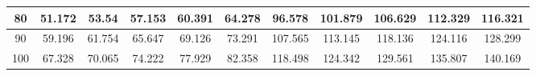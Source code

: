 \begin{table}[htb]
{\begin{tabular}{|c|c|c|c|c|c|c|c|c|c|c|}
80 & 51.172         & 53.54         & 57.153         & 60.391        & 64.278       & 96.578       & 101.879       & 106.629        & 112.329       & 116.321        \\ \hline
90          & 59.196         & 61.754        & 65.647         & 69.126        & 73.291       & 107.565      & 113.145       & 118.136        & 124.116       & 128.299        \\ \hline
100         & 67.328         & 70.065        & 74.222         & 77.929        & 82.358       & 118.498      & 124.342       & 129.561        & 135.807       & 140.169        \\ \hline
\end{tabular}}
\end{table}
